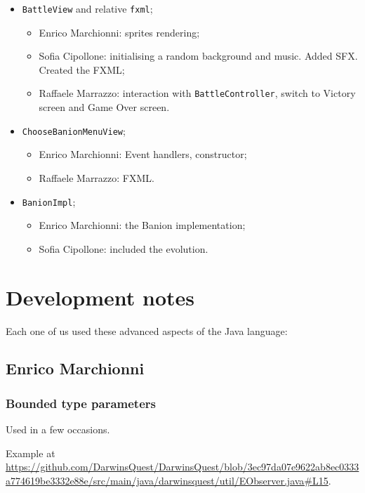 \documentclass[12pt, a4paper]{report}
\theoremstyle{definition}
\begin{document}
    \begin{itemize}
        \item \verb|BattleView| and relative \verb|fxml|;
        \begin{itemize}
            \item Enrico Marchionni: sprites rendering;
            \item Sofia Cipollone: initialising a random background and music. Added SFX. Created the FXML;
            \item Raffaele Marrazzo: interaction with \verb|BattleController|, switch to Victory screen and Game Over screen.
        \end{itemize}
        \item \verb|ChooseBanionMenuView|;
        \begin{itemize}
            \item Enrico Marchionni: Event handlers, constructor;
            \item Raffaele Marrazzo: FXML.
        \end{itemize}
        \item \verb|BanionImpl|;
        \begin{itemize}
            \item Enrico Marchionni: the Banion implementation;
            \item Sofia Cipollone: included the evolution\label{multimap}.
        \end{itemize}
    \end{itemize}

\section{Development notes}

    Each one of us used these advanced aspects of the Java language:

    \subsection*{Enrico Marchionni}

        \subsubsection{Bounded type parameters}

        Used in a few occasions.

        Example at \url{https://github.com/DarwinsQuest/DarwinsQuest/blob/3ec97da07e9622ab8ec0333a774619be3332e88e/src/main/java/darwinsquest/util/EObserver.java#L15}.
\end{document}
